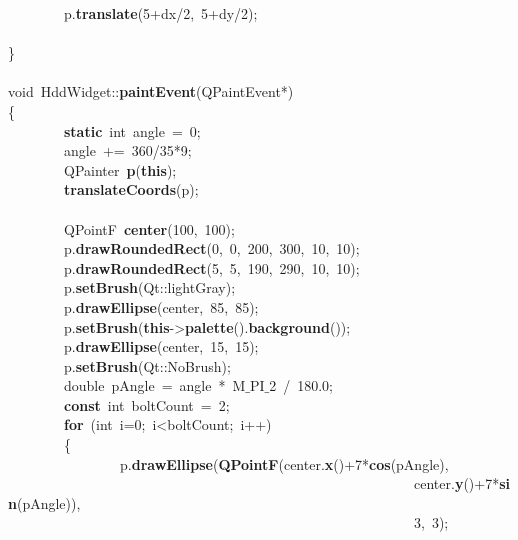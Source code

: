 \mbox{}\ \ \ \ \ \ \ \ p.\textbf{translate}(5+dx/2,\ 5+dy/2); \\
\mbox{} \\
\mbox{}\} \\
\mbox{} \\
\mbox{}void\ HddWidget::\textbf{paintEvent}(QPaintEvent*) \\
\mbox{}\{ \\
\mbox{}\ \ \ \ \ \ \ \ \textbf{static}\ int\ angle\ =\ 0; \\
\mbox{}\ \ \ \ \ \ \ \ angle\ +=\ 360/35*9; \\
\mbox{}\ \ \ \ \ \ \ \ QPainter\ \textbf{p}(\textbf{this}); \\
\mbox{}\ \ \ \ \ \ \ \ \textbf{translateCoords}(p); \\
\mbox{} \\
\mbox{}\ \ \ \ \ \ \ \ QPointF\ \textbf{center}(100,\ 100); \\
\mbox{}\ \ \ \ \ \ \ \ p.\textbf{drawRoundedRect}(0,\ 0,\ 200,\ 300,\ 10,\ 10); \\
\mbox{}\ \ \ \ \ \ \ \ p.\textbf{drawRoundedRect}(5,\ 5,\ 190,\ 290,\ 10,\ 10); \\
\mbox{}\ \ \ \ \ \ \ \ p.\textbf{setBrush}(Qt::lightGray); \\
\mbox{}\ \ \ \ \ \ \ \ p.\textbf{drawEllipse}(center,\ 85,\ 85); \\
\mbox{}\ \ \ \ \ \ \ \ p.\textbf{setBrush}(\textbf{this}-\textgreater{}\textbf{palette}().\textbf{background}()); \\
\mbox{}\ \ \ \ \ \ \ \ p.\textbf{drawEllipse}(center,\ 15,\ 15); \\
\mbox{}\ \ \ \ \ \ \ \ p.\textbf{setBrush}(Qt::NoBrush); \\
\mbox{}\ \ \ \ \ \ \ \ double\ pAngle\ =\ angle\ *\ M$\_$PI$\_$2\ /\ 180.0; \\
\mbox{}\ \ \ \ \ \ \ \ \textbf{const}\ int\ boltCount\ =\ 2; \\
\mbox{}\ \ \ \ \ \ \ \ \textbf{for}\ (int\ i=0;\ i\textless{}boltCount;\ i++) \\
\mbox{}\ \ \ \ \ \ \ \ \{ \\
\mbox{}\ \ \ \ \ \ \ \ \ \ \ \ \ \ \ \ p.\textbf{drawEllipse}(\textbf{QPointF}(center.\textbf{x}()+7*\textbf{cos}(pAngle), \\
\mbox{}\ \ \ \ \ \ \ \ \ \ \ \ \ \ \ \ \ \ \ \ \ \ \ \ \ \ \ \ \ \ \ \ \ \ \ \ \ \ \ \ \ \ \ \ \ \ \ \ \ \ \ \ \ \ \ \ \ \ center.\textbf{y}()+7*\textbf{sin}(pAngle)), \\
\mbox{}\ \ \ \ \ \ \ \ \ \ \ \ \ \ \ \ \ \ \ \ \ \ \ \ \ \ \ \ \ \ \ \ \ \ \ \ \ \ \ \ \ \ \ \ \ \ \ \ \ \ \ \ \ \ \ \ \ \ 3,\ 3); \\
